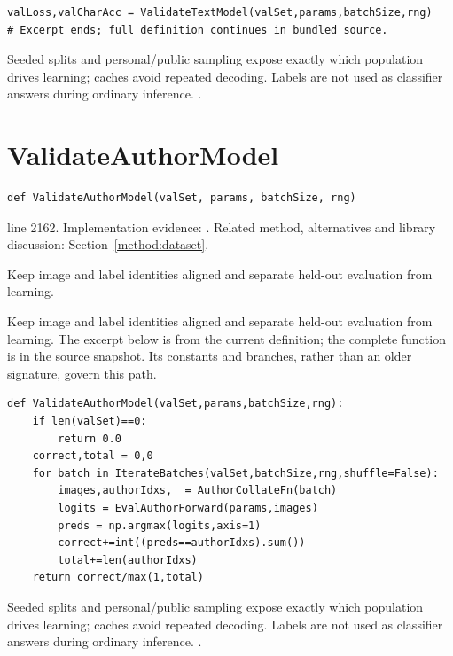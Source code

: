 \begin{lstlisting}[style=plain]
        valLoss,valCharAcc = ValidateTextModel(valSet,params,batchSize,rng)
# Excerpt ends; full definition continues in bundled source.
\end{lstlisting}
Seeded splits and personal/public sampling expose exactly which population drives learning; caches avoid repeated decoding. Labels are not used as classifier answers during ordinary inference. \cite{marti2002,code2026,torchdata}.


\section{ValidateAuthorModel}\label{fn:train:ValidateAuthorModel}
\begin{lstlisting}[style=sig]
def ValidateAuthorModel(valSet, params, batchSize, rng)
\end{lstlisting}
 line 2162. Implementation evidence: \cite{code2026}. Related method, alternatives and library discussion: Section~\ref{method:dataset}.


Keep image and label identities aligned and separate held-out evaluation from learning.


Keep image and label identities aligned and separate held-out evaluation from learning. The excerpt below is from the current definition; the complete function is in the source snapshot. Its constants and branches, rather than an older signature, govern this path.


\begin{lstlisting}[style=plain]
def ValidateAuthorModel(valSet,params,batchSize,rng):
    if len(valSet)==0:
        return 0.0
    correct,total = 0,0
    for batch in IterateBatches(valSet,batchSize,rng,shuffle=False):
        images,authorIdxs,_ = AuthorCollateFn(batch)
        logits = EvalAuthorForward(params,images)
        preds = np.argmax(logits,axis=1)
        correct+=int((preds==authorIdxs).sum())
        total+=len(authorIdxs)
    return correct/max(1,total)
\end{lstlisting}
Seeded splits and personal/public sampling expose exactly which population drives learning; caches avoid repeated decoding. Labels are not used as classifier answers during ordinary inference. \cite{marti2002,code2026,torchdata}.


